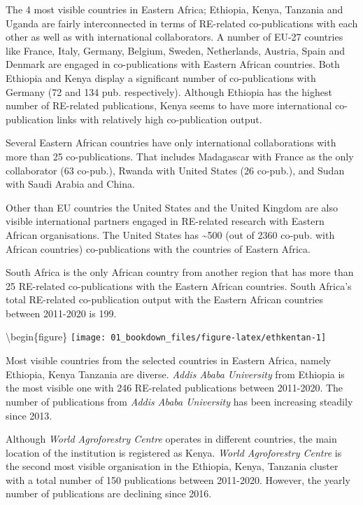 \documentclass[
]{book}
\begin{document}
The 4 most visible countries in Eastern Africa; Ethiopia, Kenya, Tanzania and Uganda are fairly interconnected in terms of RE-related co-publications with each other as well as with international collaborators. A number of EU-27 countries like France, Italy, Germany, Belgium, Sweden, Netherlands, Austria, Spain and Denmark are engaged in co-publications with Eastern African countries. Both Ethiopia and Kenya display a significant number of co-publications with Germany (72 and 134 pub. respectively). Although Ethiopia has the highest number of RE-related publications, Kenya seems to have more international co-publication links with relatively high co-publication output.

Several Eastern African countries have only international collaborations with more than 25 co-publications. That includes Madagascar with France as the only collaborator (63 co-pub.), Rwanda with United States (26 co-pub.), and Sudan with Saudi Arabia and China.

Other than EU countries the United States and the United Kingdom are also visible international partners engaged in RE-related research with Eastern African organisations. The United States has \textasciitilde500 (out of 2360 co-pub. with African countries) co-publications with the countries of Eastern Africa.

South Africa is the only African country from another region that has more than 25 RE-related co-publications with the Eastern African countries. South Africa's total RE-related co-publication output with the Eastern African countries between 2011-2020 is 199.

\textbackslash begin\{figure\}
\texttt{[image: 01\_bookdown\_files/figure-latex/ethkentan-1]}

Most visible countries from the selected countries in Eastern Africa, namely Ethiopia, Kenya Tanzania are diverse. \emph{Addis Ababa University} from Ethiopia is the most visible one with 246 RE-related publications between 2011-2020. The number of publications from \emph{Addis Ababa University} has been increasing steadily since 2013.

Although \emph{World Agroforestry Centre} operates in different countries, the main location of the institution is registered as Kenya. \emph{World Agroforestry Centre} is the second most visible organisation in the Ethiopia, Kenya, Tanzania cluster with a total number of 150 publications between 2011-2020. However, the yearly number of publications are declining since 2016.
\end{document}

